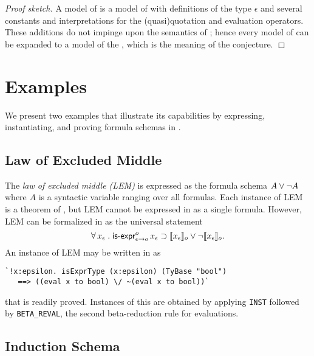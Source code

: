 \documentclass[fleqn]{llncs}
\begin{document}
\noindent
\emph{Proof sketch.}  A model of {\HLQE} is a model of {\HL} with
definitions of the type $\epsilon$ and several constants and
interpretations for the (quasi)quotation and evaluation operators.
These additions do not impinge upon the semantics of {\HL}; hence
every model of {\HL} can be expanded to a model of the {\HLQE}, which
is the meaning of the conjecture.  \hfill $\Box$

\section{Examples}\label{sec:examples}

We present two examples that illustrate its capabilities by expressing,
instantiating, and proving formula schemas in {\HLQE}.

\subsection{Law of Excluded Middle}

The \emph{law of excluded middle (LEM)} is expressed as the formula
schema $A \vee \neg A$ where $A$ is a syntactic variable ranging over
all formulas.  Each instance of LEM is a theorem of {\HOL}, but LEM
cannot be expressed in {\HOL} as a single formula.  However, LEM can
be formalized in {\churchqe} as the universal statement
\[\forall\, x_\epsilon \mathrel. 
\mbox{\sf is-expr}_{\epsilon \rightarrow o}^{o} \, x_\epsilon \supset
\llbracket x_\epsilon\rrbracket_o \vee \neg \llbracket x_\epsilon\rrbracket_o.\] An
instance of LEM may be written in {\HLQE} as
\begin{lstlisting}
`!x:epsilon. isExprType (x:epsilon) (TyBase "bool")
   ==> ((eval x to bool) \/ ~(eval x to bool))`
\end{lstlisting}
that is readily proved.  Instances of this are obtained by applying
\texttt{INST} followed by \texttt{BETA\_REVAL}, the second
beta-reduction rule for evaluations.

\subsection{Induction Schema}
\end{document}
